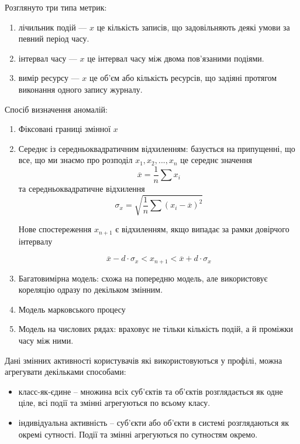 Розглянуто три типа метрик:

\begin{enumerate}
  \item лічильник подій --- $x$ це кількість записів, що 
        задовільняють деякі умови за певний період часу.
  \item інтервал часу --- $x$ це інтервал часу між двома 
        пов'язаними подіями.
  \item вимір ресурсу --- $x$ це об'єм або кількість ресурсів,
        що задіяні протягом виконання одного запису журналу.
\end{enumerate}

Спосіб визначення аномалій:

\begin{enumerate}
  \item Фіксовані границі змінної $x$
  \item Середнє із середньоквадратичним відхиленням: базується на
        припущенні, що все, що ми знаємо про розподіл
        $x_1, x_2, ..., x_n$ це середнє значення
        \begin{equation}
            \overline{x} = \frac{1}{n} \sum{x_i}
        \end{equation}
        та середньоквадратичне відхилення
        \begin{equation}
            \sigma_x = \sqrt{\frac{1}{n} \sum{(x_i - \overline{x})^2}}
        \end{equation}

        Нове спостереження $x_{n+1}$ є відхиленням, якщо випадає за рамки довірчого інтервалу

        \begin{equation}
            \overline{x} - d \cdot \sigma_x < x_{n+1} < \overline{x} + d \cdot \sigma_x
        \end{equation}

    \item Багатовимірна модель: схожа на попередню модель, але
          використовує кореляцію одразу по декільком змінним.
    \item Модель марковського процесу
    \item Модель на числових рядах: враховує не тільки кількість
          подій, а й проміжки часу між ними.
\end{enumerate}

Дані змінних активності користувачів які використовуються
у профілі, можна агрегувати декільками способами: %

\begin{itemize}
  \item класс-як-єдине -- множина всіх суб'єктів та об'єктів
        розглядається як одне ціле, всі події та змінні
        агрегуються по всьому класу.
  \item індивідуальна активність -- суб'єкти або об'єкти в 
        системі розглядаються як окремі сутності. Події та змінні агрегуються по сутностям окремо.
\end{itemize}


